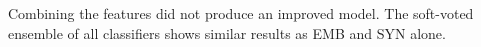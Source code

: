 Combining the features did not produce an improved model. The soft-voted ensemble of all classifiers shows similar results as EMB and SYN alone.


%



